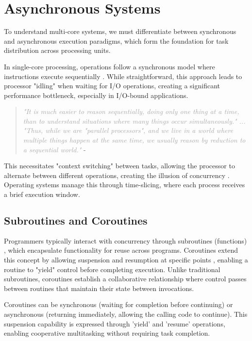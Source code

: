 \documentclass[12pt,a4paper]{article}
\begin{document}
\section{Asynchronous Systems}

To understand multi-core systems, we must differentiate between synchronous and asynchronous execution paradigms, which form the foundation for task distribution across processing units.

In single-core processing, operations follow a synchronous model where instructions execute sequentially \parencite[p. 118]{Johnson2015}. While straightforward, this approach leads to processor "idling" when waiting for I/O operations, creating a significant performance bottleneck, especially in I/O-bound applications.

\begin{quote}
    \textit{\textcolor{darkgray}{"It is much easier to reason sequentially, doing only one thing at a time, than to understand situations where many things occur simultaneously." ... "Thus, while we are "parallel processors", and we live in a world where multiple things happen at the same time, we usually reason by reduction to a sequential world."}} - \cite{Rajsbaum2020}
\end{quote}

This necessitates "context switching" between tasks, allowing the processor to alternate between different operations, creating the illusion of concurrency \parencite{Rajsbaum2020}. Operating systems manage this through time-slicing, where each process receives a brief execution window.

\subsection{Subroutines and Coroutines}

Programmers typically interact with concurrency through subroutines (functions) \parencite{Pyeatt2020}, which encapsulate functionality for reuse across programs. Coroutines extend this concept by allowing suspension and resumption at specific points \parencite{DeMouna2009}, enabling a routine to "yield" control before completing execution. Unlike traditional subroutines, coroutines establish a collaborative relationship where control passes between routines that maintain their state between invocations.

Coroutines can be synchronous (waiting for completion before continuing) or asynchronous (returning immediately, allowing the calling code to continue). This suspension capability is expressed through 'yield' and 'resume' operations, enabling cooperative multitasking without requiring task completion.
\end{document}
